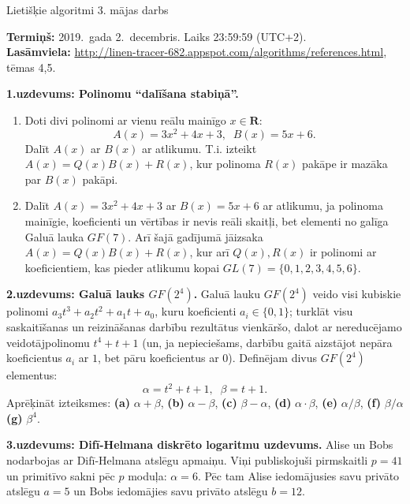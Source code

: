 \documentclass[11pt]{article}
\begin{document}
\thispagestyle{empty}

{\Large Lietišķie algoritmi \textendash{} 3. mājas darbs}

{\footnotesize
{\bf Termiņš:} 2019.\ gada 2.\ decembris. Laiks 23:59:59 (UTC+2).\\
{\bf Lasāmviela:} \url{http://linen-tracer-682.appspot.com/algorithms/references.html}, tēmas 4,5.
}

\vspace{6pt}
{\bf 1.uzdevums: Polinomu ``dalīšana stabiņā''.} 
\begin{enumerate}[label=(\alph*)]
\item Doti divi polinomi ar vienu reālu mainīgo $x \in \mathbf{R}$: 
$$A(x) = 3x^2 + 4x + 3,\;\;B(x) = 5x + 6.$$
Dalīt $A(x)$ ar $B(x)$ ar atlikumu. T.i. izteikt $A(x) = Q(x)B(x) + R(x)$, 
kur polinoma $R(x)$ pakāpe ir mazāka par $B(x)$ pakāpi.
\item Dalīt $A(x) = 3x^2 + 4x + 3$ ar $B(x) = 5x+6$ ar atlikumu, ja
polinoma mainīgie, koeficienti un vērtības ir nevis reāli skaitļi, bet
elementi no galīga Galuā lauka $GF(7)$. Arī šajā 
gadījumā jāizsaka $A(x) = Q(x)B(x) + R(x)$, kur arī $Q(x),R(x)$ ir polinomi 
ar koeficientiem, kas pieder atlikumu kopai $GL(7) = \{ 0,1,2,3,4,5,6 \}$.
\end{enumerate}

\vspace{6pt}
{\bf 2.uzdevums: Galuā lauks $GF(2^4)$.}
Galuā lauku $GF(2^4)$ veido visi kubiskie polinomi
$a_3t^3 + a_2t^2 + a_1t + a_0$, kuru 
koeficienti $a_i \in \{ 0,1 \}$; turklāt visu saskaitīšanas un 
reizināšanas darbību rezultātus vienkāršo, dalot ar nereducējamo
veidotājpolinomu $t^4 + t + 1$ (un, ja nepieciešams, darbību gaitā aizstājot 
nepāra koeficientus $a_i$ ar $1$, bet pāru koeficientus ar $0$). Definējam 
divus $GF(2^4)$ elementus:
$$\alpha = t^2 + t + 1,\;\;\beta=t+1.$$
Aprēķināt izteiksmes: {\bf (a)} $\alpha + \beta$, 
{\bf (b)} $\alpha - \beta$,
{\bf (c)} $\beta - \alpha$,
{\bf (d)} $\alpha \cdot \beta$,
{\bf (e)} $\alpha / \beta$,
{\bf (f)} $\beta / \alpha$
{\bf (g)} $\beta^4$.

\vspace{6pt}
{\bf 3.uzdevums: Difī-Helmana diskrēto logaritmu uzdevums.} 
Alise un Bobs nodarbojas ar Difī-Helmana atslēgu apmaiņu. 
Viņi publiskojuši pirmskaitli $p=41$ un primitīvo sakni 
pēc $p$ moduļa: $\alpha = 6$. Pēc tam Alise iedomājusies 
savu privāto atslēgu $a = 5$ un Bobs iedomājies savu privāto 
atslēgu $b = 12$. 
\end{document}
